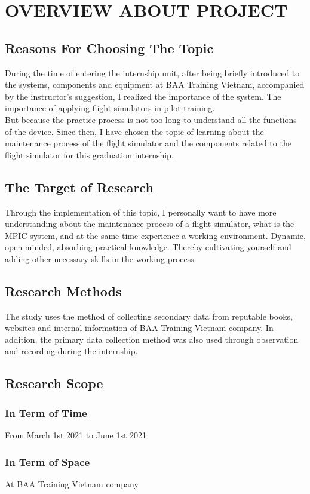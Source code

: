 \chapter{OVERVIEW ABOUT PROJECT}

\renewcommand{\headrulewidth}{0.5pt}
\renewcommand{\footrulewidth}{0.5pt}
\thispagestyle{plain}
\pagestyle{fancy}
\fancyhf{}
\raggedright
{}

\section{Reasons For Choosing The Topic}
    During the time of entering the internship unit, after being briefly introduced to the systems, components and equipment 
    at BAA Training Vietnam, accompanied by the instructor's suggestion, I realized the importance of the system. The importance 
    of applying flight simulators in pilot training. \\ 
    \vspace{3mm}
    But because the practice process is not too long to understand all the functions of the device. Since then, I have chosen the 
    topic of learning about the maintenance process of the flight simulator and the components related to the flight simulator for 
    this graduation internship.

\section{The Target of Research}
    Through the implementation of this topic, I personally want to have more understanding about the maintenance process of a flight 
    simulator, what is the MPIC system, and at the same time experience a working environment. Dynamic, open-minded, absorbing practical 
    knowledge. Thereby cultivating yourself and adding other necessary skills in the working process.

\section{Research Methods}
    The study uses the method of collecting secondary data from reputable books, websites and internal information of BAA Training Vietnam 
    company. In addition, the primary data collection method was also used through observation and recording during the internship.

\section{Research Scope}
    \subsection{In Term of Time}
        From March 1st 2021 to June 1st 2021
    \subsection{In Term of Space}
        At BAA Training Vietnam company